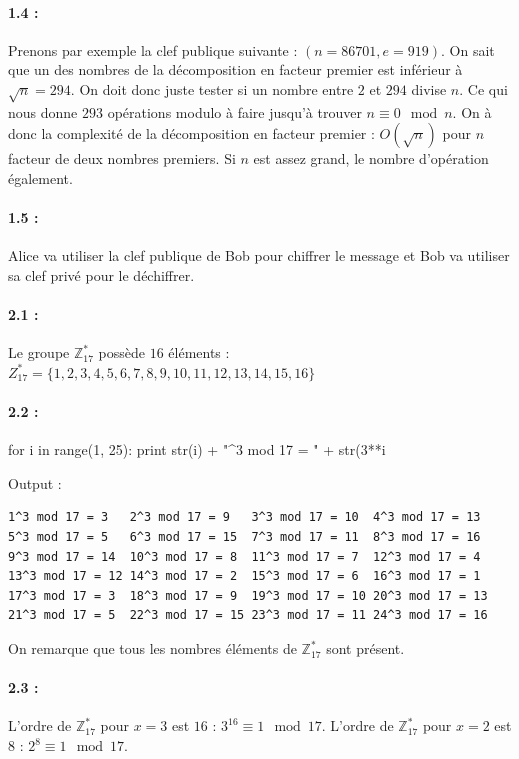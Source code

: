 \documentclass[11pt,a4paper]{report}
\begin{document}
\paragraph*{1.4 : } Prenons par exemple la clef publique suivante : $(n=86701,e=919)$. On sait que un des nombres de la décomposition en facteur premier est inférieur à $\sqrt{n} = 294$. On doit donc juste tester si un nombre entre $2$ et $294$ divise $n$. Ce qui nous donne $293$ opérations modulo à faire jusqu'à trouver $n \equiv 0 \mod n$. On à donc la complexité de la décomposition en facteur premier : $O(\sqrt{n})$ pour $n$ facteur de deux nombres premiers. Si $n$ est assez grand, le nombre d'opération également.

\paragraph*{1.5 : } Alice va utiliser la clef publique de Bob pour chiffrer le message et Bob va utiliser sa clef privé pour le déchiffrer.

\paragraph*{2.1 : } Le groupe $\mathbb{Z}^*_{17}$ possède $16$ éléments : $Z^*_{17} = \{1,2,3,4,5,6,7,8,9,10,11,12,13,14,15,16\}$
 
\paragraph*{2.2 : }
\begin{pythoncode}
for i in range(1, 25):
    print str(i) + "^3 mod 17 = " + str(3**i %
\end{pythoncode}

Output :

\begin{verbatim}
1^3 mod 17 = 3   2^3 mod 17 = 9   3^3 mod 17 = 10  4^3 mod 17 = 13
5^3 mod 17 = 5   6^3 mod 17 = 15  7^3 mod 17 = 11  8^3 mod 17 = 16
9^3 mod 17 = 14  10^3 mod 17 = 8  11^3 mod 17 = 7  12^3 mod 17 = 4
13^3 mod 17 = 12 14^3 mod 17 = 2  15^3 mod 17 = 6  16^3 mod 17 = 1
17^3 mod 17 = 3  18^3 mod 17 = 9  19^3 mod 17 = 10 20^3 mod 17 = 13
21^3 mod 17 = 5  22^3 mod 17 = 15 23^3 mod 17 = 11 24^3 mod 17 = 16
\end{verbatim}

On remarque que tous les nombres éléments de $\mathbb{Z}^*_{17}$ sont présent.

\paragraph*{2.3 : } L'ordre de $\mathbb{Z}^*_{17}$ pour $x=3$ est $16$ : $3^16 \equiv 1 \mod 17$. L'ordre de $\mathbb{Z}^*_{17}$ pour $x=2$ est $8$ : $2^8 \equiv 1 \mod 17$.
\end{document}
